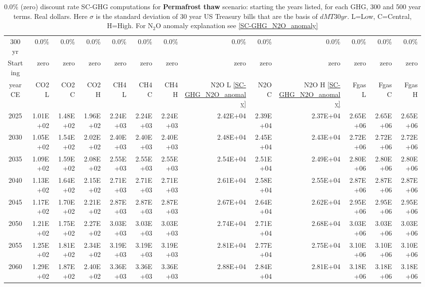 \documentclass{article}
\begin{document}
\begin{table}
      \caption{0.0\% (zero) discount rate  SC-GHG computations for \textbf{Permafrost thaw} scenario: starting the years listed, for each GHG, 300 and 500 year terms. Real dollars. Here $\sigma$ is the standard deviation of 30 year US Treasury bills that are the basis of $dMT30yr$. L=Low, C=Central, H=High. For N$_2$O anomaly explanation see \ref{SC-GHG_N2O_anomaly}} 
\label{PVs_300_yearSCC_S0.0}
\small
\begin{tabular}{crrr|rrr|rrr|rrr}
300 yr   & 0.0\%    & 0.0\%    & 0.0\%    & 0.0\%    & 0.0\%    & 0.0\%    & 0.0\%    & 0.0\%    & 0.0\%    & 0.0\%    & 0.0\%    & 0.0\%    \\
Starting & zero     & zero     & zero     & zero     & zero     & zero     & zero     & zero     & zero     & zero     & zero     & zero     \\
year CE  & CO2 L    & CO2 C    & CO2 H    & CH4 L    & CH4 C    & CH4 H    & N2O L \ref{SC-GHG_N2O_anomaly}     & N2O C      & N2O H \ref{SC-GHG_N2O_anomaly}    & Fgas L   & Fgas C   & Fgas H   \\
2025     & 1.01E+02 & 1.48E+02 & 1.96E+02 & 2.24E+03 & 2.24E+03 & 2.24E+03 & 2.42E+04 & 2.39E+04 & 2.37E+04 & 2.65E+06 & 2.65E+06 & 2.65E+06 \\
2030     & 1.05E+02 & 1.54E+02 & 2.02E+02 & 2.40E+03 & 2.40E+03 & 2.40E+03 & 2.48E+04 & 2.45E+04 & 2.43E+04 & 2.72E+06 & 2.72E+06 & 2.72E+06 \\
2035     & 1.09E+02 & 1.59E+02 & 2.08E+02 & 2.55E+03 & 2.55E+03 & 2.55E+03 & 2.54E+04 & 2.51E+04 & 2.49E+04 & 2.80E+06 & 2.80E+06 & 2.80E+06 \\
2040     & 1.13E+02 & 1.64E+02 & 2.15E+02 & 2.71E+03 & 2.71E+03 & 2.71E+03 & 2.61E+04 & 2.58E+04 & 2.55E+04 & 2.87E+06 & 2.87E+06 & 2.87E+06 \\
2045     & 1.17E+02 & 1.70E+02 & 2.21E+02 & 2.87E+03 & 2.87E+03 & 2.87E+03 & 2.67E+04 & 2.64E+04 & 2.62E+04 & 2.95E+06 & 2.95E+06 & 2.95E+06 \\
2050     & 1.21E+02 & 1.75E+02 & 2.27E+02 & 3.03E+03 & 3.03E+03 & 3.03E+03 & 2.74E+04 & 2.71E+04 & 2.68E+04 & 3.03E+06 & 3.03E+06 & 3.03E+06 \\
2055     & 1.25E+02 & 1.81E+02 & 2.34E+02 & 3.19E+03 & 3.19E+03 & 3.19E+03 & 2.81E+04 & 2.77E+04 & 2.75E+04 & 3.10E+06 & 3.10E+06 & 3.10E+06 \\
2060     & 1.29E+02 & 1.87E+02 & 2.40E+02 & 3.36E+03 & 3.36E+03 & 3.36E+03 & 2.88E+04 & 2.84E+04 & 2.81E+04 & 3.18E+06 & 3.18E+06 & 3.18E+06 \\

\end{tabular}
\end{table}
\end{document}
